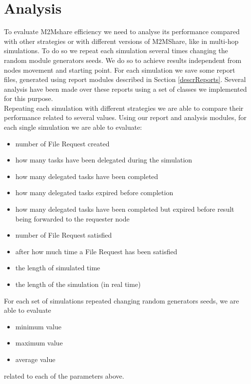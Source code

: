 \section{Analysis}
To evaluate M2Mshare efficiency we need to analyse its performance compared with other strategies or with different versions of M2MShare, like in multi-hop simulations. To do so we repeat each simulation several times changing the random module generators seeds. We do so to achieve results independent from nodes movement and starting point. For each simulation we save some report files, generated using report modules described in Section \ref{descrReports}. Several analysis have been made over these reports using a set of classes we implemented for this purpose. 
\\

Repeating each simulation with different strategies we are able to compare their performance related to several values. Using our report and analysis modules, for each single simulation we are able to evaluate:
\begin{itemize}
\item number of File Request created
\item how many tasks have been delegated during the simulation
\item how many delegated tasks have been completed
\item how many delegated tasks expired before completion
\item how many delegated tasks have been completed but expired before result being forwarded to the requester node
\item number of File Request satisfied
\item after how much time a File Request has been satisfied
\item the length of simulated time
\item the length of the simulation (in real time)
\end{itemize} 

For each set of simulations repeated changing random generators seeds, we are able to evaluate 
\begin{itemize}
\item minimum value
\item maximum value
\item average value
\end{itemize} 
related to each of the parameters above.
 


